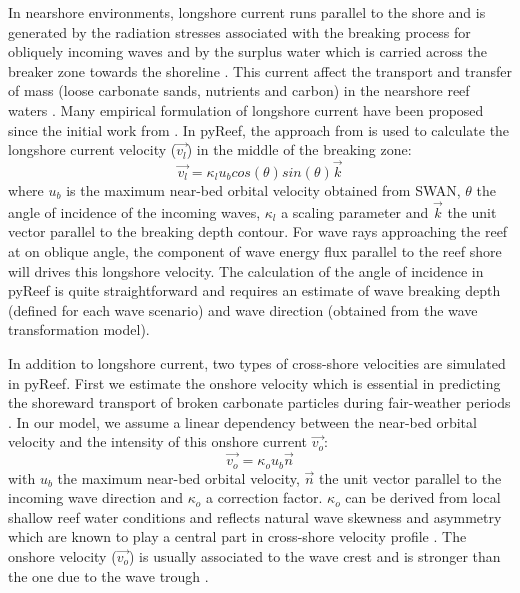 \documentclass[default,jgrga]{agutex2015}
\begin{document}
\begin{article}
In nearshore environments, longshore current runs parallel to the shore and is generated by the radiation stresses associated with the breaking process for obliquely incoming waves and by the surplus water which is carried across the breaker zone towards the shoreline \citep{Longuet-Higgins70}. This current affect the transport and transfer of mass (loose carbonate sands, nutrients and carbon) in the nearshore reef waters \citep{Hamner88, Monismith07, Lowe15}. Many empirical formulation of longshore current have been proposed since the initial work from   \citet{Longuet-Higgins64}  \citep{Komar70, Komar75, Galvin87, Reniers97, Ruessink01, Grasmeijer03}. In pyReef, the approach from \citet{Komar75} is used to calculate the longshore current velocity ($\vec{v_l}$) in the middle of the breaking zone:
\begin{equation}
\vec{v_l} = \kappa_l u_{b} cos(\theta) sin(\theta) \vec{k}
\end{equation}
where $u_b$ is the maximum near-bed orbital velocity obtained from SWAN, $\theta$ the angle of incidence of the incoming waves, $\kappa_l$  a scaling parameter and $\vec{k}$ the unit vector parallel to the breaking depth contour. For wave rays approaching the reef at on oblique angle, the component of wave energy flux parallel to the reef shore will drives this longshore velocity. The calculation of the angle of incidence in pyReef is quite straightforward and requires an estimate of wave breaking depth (defined for each wave scenario) and wave direction (obtained from the wave transformation model).

In addition to longshore current, two types of cross-shore velocities are simulated in pyReef. First we estimate the onshore velocity which is essential in predicting the shoreward transport of broken carbonate particles during fair-weather periods  \citep{Elfrink99, Ruessink98}. In our model, we assume a linear dependency between the near-bed orbital velocity and the intensity of this onshore current $\vec{v_o}$:
\begin{equation}
\vec{v_o} = \kappa_o u_b \vec{n}
\end{equation}
with $u_b$ the maximum near-bed orbital velocity, $\vec{n}$ the unit vector parallel to the incoming wave direction and $\kappa_o$ a correction factor. $\kappa_o$ can be derived from local shallow reef water conditions and reflects natural wave skewness and asymmetry which are known to play a central part in cross-shore velocity profile \citep{Grasmeijer03, Crawford03}. The onshore velocity ($\vec{v_o}$) is usually associated to the wave crest and is stronger than the one due to the wave trough \citep{Isobe82, Grasmeijer03}.


\end{article}
\end{document}

